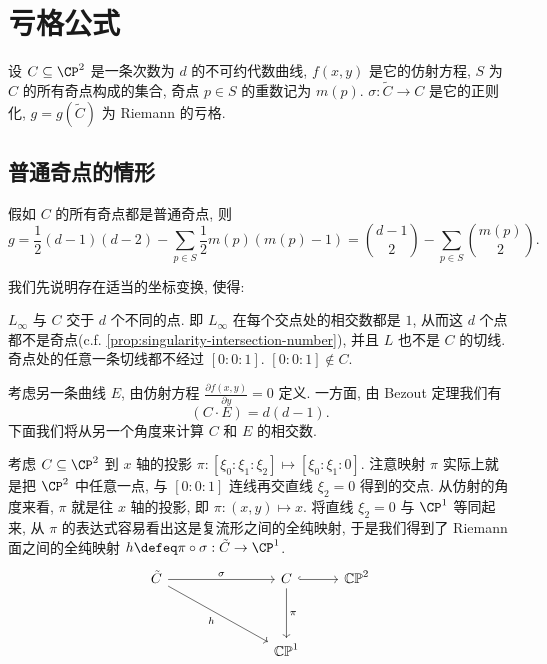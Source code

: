 \chapter{亏格公式}
\label{chap:chap-4}

\fontsize{12bp}{14.4pt}

设 $C\subseteq \CP^2$ 是一条次数为 $d$ 的不可约代数曲线,
$f(x,y)$ 是它的仿射方程,
$S$ 为 $C$ 的所有奇点构成的集合, 奇点 $p \in S$ 的重数记为 $m(p)$.
$\sigma: \tilde{C} \to C$ 是它的正则化,
$g = g(\tilde{C})$ 为 Riemann 的亏格.

\section{普通奇点的情形}

\begin{thm}[普通奇点的亏格公式]
\label{thm:genus-formula-ordinary}
假如 $C$ 的所有奇点都是普通奇点, 则
\begin{equation}
\label{eq:genus-formula-ordinary}
g = \frac{1}{2}(d-1)(d-2) - \sum_{p \in S}\frac{1}{2}m(p)(m(p) - 1) = \binom{d-1}{2} - \sum_{p \in S}\binom{m(p)}{2}.
\end{equation}
\end{thm}

我们先说明存在适当的坐标变换, 使得:
\begin{enumerate}[label=(\alph*)]
    \ii $L_\infty$ 与 $C$ 交于 $d$ 个不同的点.
    即 $L_\infty$ 在每个交点处的相交数都是 $1$,
    从而这 $d$ 个点都不是奇点(c.f. \cref{prop:singularity-intersection-number}),
    并且 $L$ 也不是 $C$ 的切线.
    \ii 奇点处的任意一条切线都不经过 $[0:0:1]$.
    \ii $[0:0:1] \notin C$.
\end{enumerate}

考虑另一条曲线 $E$, 由仿射方程 $\frac{\partial f(x,y)}{\partial y} = 0$ 定义.
一方面, 由 Bezout 定理我们有
\[(C\cdot E) = d(d-1).\]
下面我们将从另一个角度来计算 $C$ 和 $E$ 的相交数.

考虑 $C \subseteq \CP^2$ 到 $x$ 轴的投影
$\pi: [\xi_0:\xi_1:\xi_2]\mapsto [\xi_0:\xi_1:0]$.
注意映射 $\pi$ 实际上就是把 $\CP^2$ 中任意一点,
与 $[0:0:1]$ 连线再交直线 $\xi_2 = 0$ 得到的交点.
从仿射的角度来看, $\pi$ 就是往 $x$ 轴的投影, 即 $\pi: (x,y) \mapsto x$.
将直线 $\xi_2 = 0$ 与 $\CP^1$ 等同起来,
从 $\pi$ 的表达式容易看出这是复流形之间的全纯映射,
于是我们得到了 Riemann 面之间的全纯映射 $h\defeq \pi\circ \sigma: \tilde{C} \to \CP^1$.
\[\begin{tikzcd}
	{\tilde{C}} &&& C & {\mathbb{CP}^2} \\
	\\
	&&& {\mathbb{CP}^1}
	\arrow["\sigma", from=1-1, to=1-4]
	\arrow[hook, from=1-4, to=1-5]
	\arrow["\pi", from=1-4, to=3-4]
	\arrow["h"', from=1-1, to=3-4]
\end{tikzcd}\]

